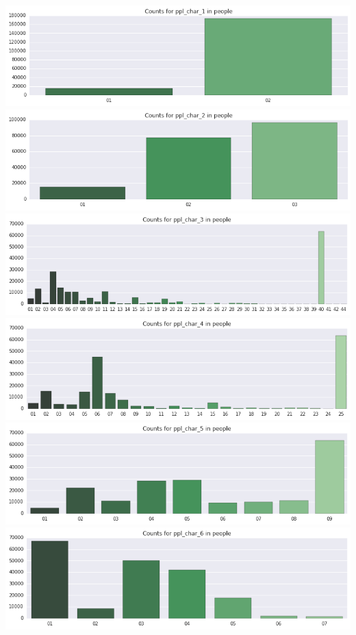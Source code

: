 \documentclass[]{report}
\begin{document}
\includegraphics{BarPlots_files/BarPlots_4_0.png}
\includegraphics{BarPlots_files/BarPlots_5_0.png}
\includegraphics{BarPlots_files/BarPlots_5_1.png}
\includegraphics{BarPlots_files/BarPlots_5_2.png}
\includegraphics{BarPlots_files/BarPlots_5_3.png}
\includegraphics{BarPlots_files/BarPlots_5_4.png}
\end{document}
